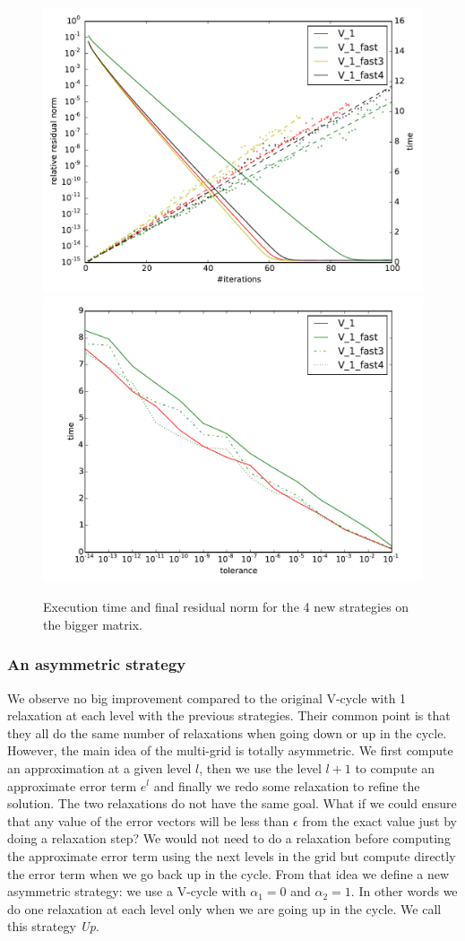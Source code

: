 \documentclass[10pt,conference]{IEEEtran}
\begin{document}
  \begin{figure}
  \includegraphics[width=0.49\linewidth]{figs/convergence_fast.pdf}
   \includegraphics[width=0.49\linewidth]{figs/time_convergence_fast.pdf}
   \caption{Execution time and final residual norm for the 4 new strategies on the bigger matrix.}
   \label{fig.newstrat}
  \end{figure}
  
\subsubsection{An asymmetric strategy}
\label{sec.assymetric}
  We observe no big improvement compared to the original V-cycle with 1 relaxation at each level with the previous strategies.
  Their common point is that they all do the same number of relaxations when going down or up in the cycle. However, the main idea of the multi-grid is totally asymmetric.
  We first compute an approximation at a given level $l$, then we use the level $l+1$ to compute an approximate error term $e^l$ and finally we redo some relaxation to refine the solution. The two relaxations do not have the same goal.
  What if we could ensure that any value of the error vectors will be less than $\epsilon$ from the exact value just by doing a relaxation step? We would not need to do a relaxation
  before computing the approximate error term using the next levels in the grid but compute directly the error term when we go back up in the cycle. From that idea we define a new asymmetric strategy: we use a V-cycle with $\alpha_1 = 0$ and $\alpha_2 = 1$. In other words
  we do one relaxation at each level only when we are going up in the cycle. We call this strategy \emph{Up}.
  
\end{document}

